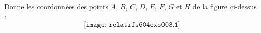 Donne les coordonnées des points $A$, $B$, $C$, $D$, $E$, $F$, $G$ et $H$ de la figure ci-dessus :
\[\texttt{[image: relatifs604exo003.1]}\]
